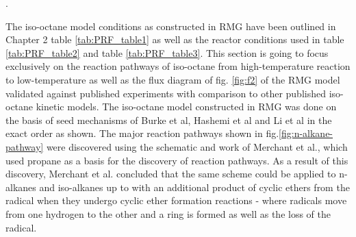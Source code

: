 . \par
\vspace{0.5cm}
The iso-octane model conditions as constructed in RMG have been outlined in Chapter 2 table \ref{tab:PRF_table1} as well as the reactor conditions used in table \ref{tab:PRF_table2} and table \ref{tab:PRF_table3}. This section is going to focus exclusively on the reaction pathways of iso-octane from high-temperature reaction to low-temperature as well as the flux diagram of fig. \ref{fig:f2} of the RMG model validated against published experiments with comparison to other published iso-octane kinetic models. The iso-octane model constructed in RMG was done on the basis of seed mechanisms of 
Burke et al\cite{Burke2012ComprehensiveCombustion}, Hashemi et al\cite{Hashemi2016High-pressureMethane} and Li et al\cite{Li2017TheoreticalC2H4} in the exact order as shown. The major reaction pathways shown in fig.\ref{fig:n-alkane-pathway} were discovered using the schematic and work of Merchant et al.\cite{Merchant2015UnderstandingPropane}, which used propane as a basis for the discovery of reaction pathways. As a result of this discovery, Merchant et al. concluded that the same scheme could be applied to n-alkanes and iso-alkanes up to  with an additional product of cyclic ethers from the  radical when they undergo cyclic ether formation reactions - where radicals move from one hydrogen to the other and a ring is formed as well as the loss of the  radical.



\newpage

